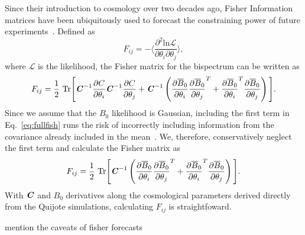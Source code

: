 \documentclass[12pt, letterpaper, preprint]{aastex62}
\newcommand{\smnu}{\sum m_\nu}
\newcommand{\sig}{\sigma_8}
\newcommand{\bfi}[1]{\textbf{\textit{#1}}}
\newcommand{\parti}[1]{\frac{\partial #1}{\partial \theta_i}}
\newcommand{\partj}[1]{\frac{\partial #1}{\partial \theta_j}}
\newcommand{\beq}{\begin{equation}}
\newcommand{\eeq}{\end{equation}}
\newcommand{\ch}[1]{{\color{orange}{\bf CH:} #1}}
\begin{document}
Since their introduction to cosmology over two decades ago, Fisher Information 
matrices have been ubiquitously used to forecast the constraining power of future 
experiments~\citep{jungman1996,tegmark1997a,dodelson2003,heavens2009,verde2010}. 
Defined as 
\beq 
F_{ij} = - \bigg \langle \frac{\partial^2 \mathrm{ln} \mathcal{L}}{\partial \theta_i \partial \theta_j} \bigg \rangle,
\eeq
where $\mathcal{L}$ is the likelihood, the Fisher matrix for the bispectrum can 
be written as 
\beq \label{eq:fullfish} 
F_{ij} = \frac{1}{2}~\mathrm{Tr} \Bigg[\bfi{C}^{-1}\parti{C}\bfi{C}^{-1}\partj{C} + \bfi{C}^{-1} \left(\parti{\overline{B}_0}\partj{\overline{B}_0}^T + \parti{\overline{B}_0}^T \partj{\overline{B}_0} \right)\Bigg].
\eeq
Since we assume that the $B_0$ likelihood is Gaussian, including the first 
term in Eq.~\ref{eq:fullfish} runs the risk of incorrectly including information 
from the covariance already included in the mean~\citep{carron2013}. We, therefore,
conservatively neglect the first term and calculate the Fisher matrix as 
\beq \label{eq:fisher}
F_{ij} = \frac{1}{2}~\mathrm{Tr} \Bigg[\bfi{C}^{-1} \left(\parti{\overline{B}_0}\partj{\overline{B}_0}^T + \parti{\overline{B}_0}^T \partj{\overline{B}_0} \right)\Bigg].
\eeq
With $\bfi{C}$ and $B_0$ derivatives along the cosmological parameters derived 
directly from the Quijote simulations, calculating $F_{ij}$ is straightfoward. 


\ch{mention the caveats of fisher forecasts} 

%
%
\end{document}
